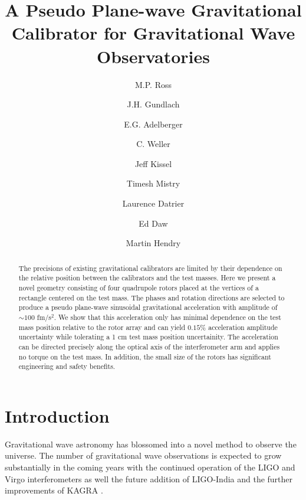 \documentclass[superscriptaddress, twocolumn, prd]{revtex4-1}
\begin{document}
\title{A Pseudo Plane-wave Gravitational Calibrator for Gravitational Wave Observatories}

\author{M.P. Ross}
\author{J.H. Gundlach}
\author{E.G. Adelberger}
\author{C. Weller}
\author{Jeff Kissel}
\author{Timesh Mistry}
\author{Laurence Datrier}
\author{Ed Daw}
\author{Martin Hendry}



\begin{abstract}

 The precisions of existing gravitational calibrators are limited by their dependence on the relative position between the calibrators and the test masses. Here we present a novel geometry consisting of four quadrupole rotors placed at the vertices of a rectangle centered on the test mass. The phases and rotation directions are selected to produce a pseudo plane-wave  sinusoidal gravitational acceleration with amplitude of $\sim100$ fm/s$^2$. We show that this acceleration only has minimal dependence on the test mass position relative to the rotor array and can yield $0.15 \%$ acceleration amplitude uncertainty while tolerating a 1 cm test mass position uncertainity. The acceleration can be directed precisely along the optical axis of the interferometer arm and applies no torque on the test mass. In addition, the small size of the rotors has significant engineering and safety benefits.

\end{abstract}

\maketitle

\section{Introduction}

Gravitational wave astronomy has blossomed into a novel method to observe the universe. The number of gravitational wave observations is expected to grow substantially in the coming years with the continued operation of the LIGO \cite{aLIGO} and Virgo \cite{virgo} interferometers as well the future addition of LIGO-India \cite{ligo-india} and the further improvements of KAGRA \cite{kagra}. 
\end{document}
